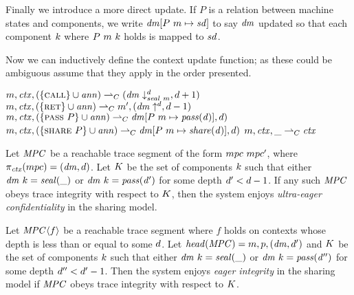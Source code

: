 \documentclass[acmsmall,review,anonymous]{acmart}\settopmatter{printfolios=true,printccs=false,printacmref=false}
\begin{document}
Finally we introduce a more direct update. If \(P\) is a relation between machine states and
components, we write \(\mathit{dm}[P ~ m \mapsto \mathit{sd}]\) to say \(\mathit{dm}\) updated
so that each component \(k\) where \(P ~ m ~ k\) holds is mapped to
\(\mathit{sd}\).

Now we can inductively define the context update function; as these could be ambiguous assume that
they apply in the order presented.

\begin{center}
  \judgment{\(\mach,\context,\ann \stepstocon (\domMap,\depth)\)}
           {\(m,\mathit{ctx},(\{\text{\sc call}\} \cup \mathit{ann}) \overset{}{\rightharpoonup}_C
             (\mathit{dm} \downarrow^{d}_{\mathit{seal} ~ m},d+1)\)}
  \judgment{\(\mach,\context,\ann \stepstocon (\domMap,\depth)\)}
           {\(m,\mathit{ctx},(\{\text{\sc ret}\} \cup \mathit{ann}) \overset{}{\rightharpoonup}_C
             m',(\mathit{dm} \uparrow^{d},d-1)\)}
  \judgment{\(\mach,\context,\ann \stepstocon (\domMap,\depth)\)}
           {\(m,\mathit{ctx},(\{\text{\sc pass} ~ P\} \cup \mathit{ann}) \overset{}{\rightharpoonup}_C
             \mathit{dm}[P ~ m \mapsto \mathit{pass(d)}], d)\)}
  \judgment{\(\mach,\context,\ann \stepstocon (\domMap,\depth)\)}
           {\(m,\mathit{ctx},(\{\text{\sc share} ~ P\} \cup \mathit{ann}) \overset{}{\rightharpoonup}_C
             \mathit{dm}[P ~ m \mapsto \mathit{share(d)}], d)\)}
  \judgment{}
           {\(m,\mathit{ctx},\_ \overset{}{\rightharpoonup}_C \mathit{ctx}\)}
\end{center}

 Let \(\mathit{MPC}\) be a reachable trace segment of the form
\(mpc ~ mpc'\), where \(\pi_{\mathit{ctx}}(mpc) = (\mathit{dm},d)\).
Let \(K\) be the set of components \(k\) such that either
\(\mathit{dm} ~ k = \mathit{seal(\_)}\) or \(\mathit{dm} ~ k = \mathit{pass(d')}\) for
some depth \(d' < d-1\). If any such \(\mathit{MPC}\) obeys trace integrity with respect
to \(K\), then the system enjoys {\em ultra-eager confidentiality} in the sharing
model.

 Let \(\mathit{MPC} \langle f \rangle\) be a reachable trace segment where \(f\) holds
on contexts whose depth is less than or equal to some \(d\). Let \(\mathit{head}(\mathit{MPC}) =
m,p,(\mathit{dm},d')\) and \(K\) be the set of components
\(k\) such that either \(\mathit{dm} ~ k = \mathit{seal(\_)}\) or
\(\mathit{dm} ~ k = \mathit{pass(d'')}\) for some depth \(d'' < d'-1\).
Then the system enjoys {\em eager integrity} in the sharing model if \(\mathit{MPC}\) obeys
trace integrity with respect to \(K\).
\end{document}
